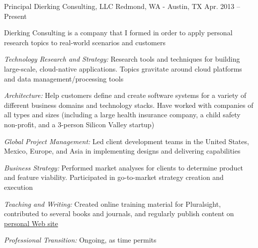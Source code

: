 \begin{cventries}
\cventry 
{Principal}
{Dierking Consulting, LLC}
{Redmond, WA - Austin, TX}
{Apr. 2013 – Present}
{ %
\begin{cvitems}
\item {Dierking Consulting is a company that I formed in order to apply personal research topics to real-world scenarios and customers }
\item {\emph{Technology Research and Strategy:} Research tools and techniques for building large-scale, cloud-native applications. Topics gravitate around cloud platforms and data management/processing tools }
\item {\emph{Architecture:} Help customers define and create software systems for a variety of different business domains and technology stacks. Have worked with companies of all types and sizes (including a large health insurance company, a child safety non-profit, and a 3-person Silicon Valley startup) }
\item {\emph{Global Project Management:} Led client development teams in the United States, Mexico, Europe, and Asia in implementing designs and delivering capabilities }
\item {\emph{Business Strategy:} Performed market analyses for clients to determine product and feature viability. Participated in go-to-market strategy creation and execution }
\item {\emph{Teaching and Writing:} Created online training material for Pluralsight, contributed to several books and journals, and regularly publish content on \href{https://www.howarddierking.com}{personal Web site} }
\item {\emph{Professional Transition:} Ongoing, as time permits }
\end{cvitems}
}



\end{cventries}

